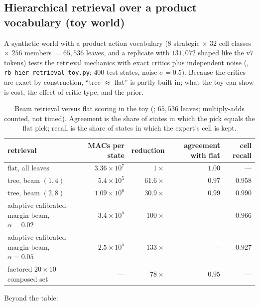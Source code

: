 \subsection{Hierarchical retrieval over a product vocabulary (toy world)}
\label{sec:prelim-toys}
A synthetic world with a product action vocabulary ($8$ strategic $\times$ $32$ cell classes $\times$ $256$ members $=65{,}536$ leaves, and a replicate with $131{,}072$ shaped like the v7 tokens) tests the retrieval mechanics with exact critics plus independent noise (\evM, \texttt{rb\_hier\_retrieval\_toy.py}; $400$ test states, noise $\sigma=0.5$). Because the critics are exact by construction, ``tree $\approx$ flat'' is partly built in; what the toy can show is cost, the effect of critic type, and the prior.
\begin{table}[h]
\centering\small
\caption{Beam retrieval versus flat scoring in the toy (\evM; $65{,}536$ leaves; multiply-adds counted, not timed). Agreement is the share of states in which the pick equals the flat pick; recall is the share of states in which the expert's cell is kept.}
\label{tab:tree}
\begin{tabular}{@{}lrrrr@{}}
\toprule
retrieval & MACs per state & reduction & agreement with flat & cell recall \\ \midrule
flat, all leaves & $3.36\times10^{7}$ & $1\times$ & $1.00$ & --- \\
tree, beam $(1,4)$ & $5.4\times10^{5}$ & $61.6\times$ & $0.97$ & $0.958$ \\
tree, beam $(2,8)$ & $1.09\times10^{6}$ & $30.9\times$ & $0.99$ & $0.990$ \\
adaptive calibrated-margin beam, $\alpha=0.02$ & $3.4\times10^{5}$ & $100\times$ & --- & $0.966$ \\
adaptive calibrated-margin beam, $\alpha=0.05$ & $2.5\times10^{5}$ & $133\times$ & --- & $0.927$ \\
factored $20\times10$ composed set & --- & $78\times$ & $0.95$ & --- \\
\bottomrule
\end{tabular}
\end{table}
Beyond the table:
